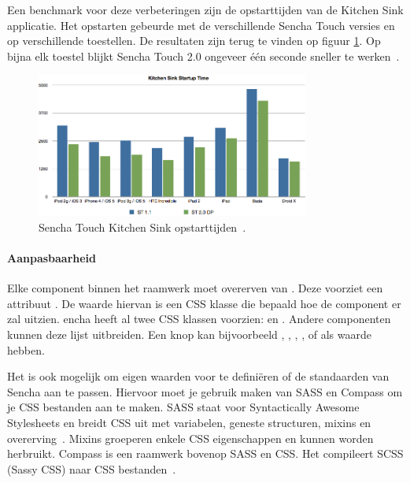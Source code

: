 Een benchmark voor deze verbeteringen zijn de opstarttijden van de Kitchen Sink applicatie.  
Het opstarten gebeurde met de verschillende Sencha Touch versies en op verschillende toestellen.  
De resultaten zijn terug te vinden op figuur \ref{fig:sencha_performance}.  
Op bijna elk toestel blijkt Sencha Touch 2.0 ongeveer één seconde sneller te werken~\cite{SenchaInc.2013}.

\begin{figure}
  \centering
  \includegraphics[width=0.8\textwidth]{figuren/sencha-touch-startup-times.png}
  \caption{Sencha Touch Kitchen Sink opstarttijden~\cite{SenchaInc.2013}.}
  \label{fig:sencha_performance}
\end{figure}

\paragraph{Aanpasbaarheid}
\label{sec:sencha-aanpasbaarheid}
Elke component binnen het raamwerk moet overerven van .  
Deze voorziet een attribuut .  De waarde hiervan is een CSS klasse die bepaald hoe de component er zal uitzien.  
encha heeft al twee CSS klassen voorzien:   en .  
Andere componenten kunnen deze lijst uitbreiden.  
Een knop kan bijvoorbeeld ,  ,  ,  ,   of  als  waarde hebben.

Het is ook mogelijk om eigen waarden voor  te definiëren of de standaarden van Sencha aan te passen.  
Hiervoor moet je gebruik maken van SASS en Compass om je CSS bestanden aan te maken.  
SASS staat voor Syntactically Awesome Stylesheets en breidt CSS uit met variabelen,  geneste structuren,  mixins en overerving~\cite{Eppstein2013}.  
Mixins groeperen enkele CSS eigenschappen en kunnen worden herbruikt.  
Compass is een raamwerk bovenop SASS en CSS.  Het compileert SCSS (Sassy CSS) naar CSS bestanden~\cite{Eppstein2013a}.        

